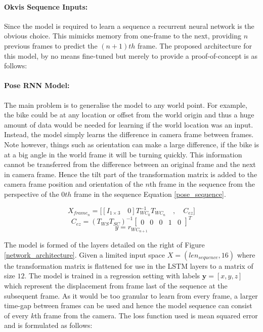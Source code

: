 \documentclass[11pt,twoside]{report}
\begin{document}
\paragraph{Okvis Sequence Inputs:}
Since the model is required to learn a sequence a recurrent neural network is the obvious choice. This mimicks memory from one-frame to the next, providing $n$ previous frames to predict the $(n+1)th$ frame. The proposed architecture for this model, by no means fine-tuned but merely to provide a proof-of-concept is as follows:

\paragraph{Pose RNN Model:} \label{pose_model}
The main problem is to generalise the model to any world point. For example, the bike could be at any location or offset from the world origin and thus a huge amount of data would be needed for learning if the world location was an input. Instead, the model simply learns the difference in camera frame between frames. Note however, things such as orientation can make a large difference, if the bike is at a big angle in the world frame it will be turning quickly. This information cannot be transferred from the difference between an original frame and the next in camera frame. Hence the tilt part of the transformation matrix is added to the camera frame position and orientation of the $n$th frame in the sequence from the perspective of the $0th$ frame in the sequence Equation \ref{pose_sequence}.


\begin{equation}
X_{frame_{n}} = 
\bigg [ [I_{1 \times 3} \quad 0]T^{-1}_{WC_{0}}T_{WC_{n}} \quad , \quad C_{ez}\bigg ]
\end{equation}
\begin{equation}
C_{ez} = (T_{WS} T_{SC})^{-1}
\begin{bmatrix}
0 & 0 & 0 & 1 & 0
\end{bmatrix}^{T}
\end{equation}
\begin{equation}
y = r_{WC_{n+1}}
\label{pose_sequence}
\end{equation}

The model is formed of the layers detailed on the right of Figure \ref{network_architecture}. Given a limited input space $X = (len_{sequence}, 16)$ where the transformation matrix is flattened for use in the LSTM layers to a matrix of size $12$. The model is trained in a regression setting with labels $\mathbf{y}=[x,y,z]$ which represent the displacement from frame last of the sequence at the subsequent frame. As it would be too granular to learn from every frame, a larger time-gap between frames can be used and hence the model sequence can consist of every $k$th frame from the camera. The loss function used is mean squared error and is formulated as follows:
\end{document}
